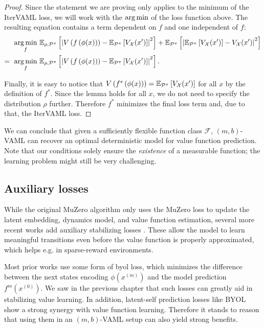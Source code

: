 \begin{proof}
Since the statement we are proving only applies to the minimum of the IterVAML loss, we will work with the $\operatorname*{arg\,min}$ of the loss function above.
The resulting equation contains a term dependent on $f$ and one independent of $f$:
\begin{align}
    \operatorname*{arg\,min}_f~ & \mathbb{E}_{\rho,\mathcal{P}^\pi}\left[  \left|{V\left( f\left( \phi(x) \right) \right) - \mathbb{E}_{\mathcal{P}^\pi}\left[  V_\mathcal{X}(x') \right]}\right|^2 \right] + \mathbb{E}_{\mathcal{P}^\pi}\left[  \left|{\mathbb{E}_{\mathcal{P}^\pi}\left[  V_\mathcal{X}(x') \right] - V_\mathcal{X}(x') }\right|^2 \right]\\
    =~ \operatorname*{arg\,min}_f~ & \mathbb{E}_{\rho,\mathcal{P}^\pi}\left[  \left|{V\left( f\left( \phi(x) \right) \right) - \mathbb{E}_{\mathcal{P}^\pi}\left[  V_\mathcal{X}(x') \right]}\right|^2 \right].
\end{align}

Finally, it is easy to notice that $V\left( f^*\left( \phi(x) \right) \right) = \mathbb{E}_{\mathcal{P}^\pi}\left[  V_\mathcal{X}(x') \right]$ for all $x$ by the definition of $f^*$.
Since the lemma holds for all $x$, we do not need to specify the distribution $\rho$ further.
Therefore $f^*$ minimizes the final loss term and, due to that, the IterVAML loss.

\end{proof}

We can conclude that given a sufficiently flexible function class $\mathcal{F}$, $(m,b)$-VAML can recover an optimal deterministic model for value function prediction.
Note that our conditions solely ensure the \emph{existence} of a measurable function; the learning problem might still be very challenging.

\subsection{Auxiliary losses}

While the original MuZero algorithm only uses the MuZero loss to update the latent embedding, dynamics model, and value function estimation, several more recent works add auxiliary stabilizing losses \parencite{ye2021mastering,hafner2021mastering,hansen2024tdmpc,voelcker2025mad}.
These allow the model to learn meaningful transitions even before the value function is properly approximated, which helps e.g. in sparse-reward environments.

Most prior works use some form of \ac{byol} \parencite{grill2020bootstrap} loss, which minimizes the difference between the next states encoding $\phi(x^{(m)})$ and the model prediction $f^m(x^{(0)})$.
We saw in the previous chapter that such losses can greatly aid in stabilizing value learning.
In addition, latent-self prediction losses like BYOL show a strong synergy with value function learning.
Therefore it stands to reason that using them in an $(m,b)$-VAML setup can also yield strong benefits.

